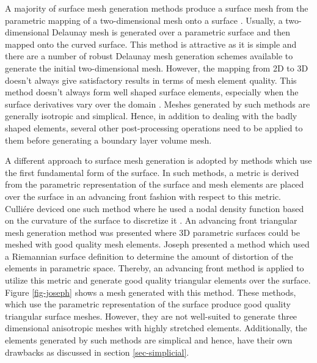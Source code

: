 
A majority of surface mesh generation methods produce a surface mesh from the parametric mapping of a two-dimensional mesh onto a surface \cite{george1998delaunay, chen1997delaunay}. Usually, a two-dimensional Delaunay mesh is generated over a parametric surface and then mapped onto the curved surface. This method is attractive as it is simple and there are a number of robust Delaunay mesh generation schemes available to generate the initial two-dimensional mesh. However, the mapping from 2D to 3D doesn't always give satisfactory results in terms of mesh element quality. This method doesn't always form well shaped surface elements, especially when the surface derivatives vary over the domain \cite{owen1998survey}. Meshes generated by such methods are generally isotropic and simplical. Hence, in addition to dealing with the badly shaped elements, several other post-processing operations need to be applied to them before generating a boundary layer volume mesh.


A different approach to surface mesh generation is adopted by methods which use the first fundamental form of the surface. In such methods, a metric is derived from the parametric representation of the surface and mesh elements are placed over the surface in an advancing front fashion with respect to this metric. Culli\'ere deviced one such method where he used a nodal density function based on the curvature of the surface to discretize it \cite{cuilliere1998adaptive}. An advancing front triangular mesh generation method was presented where 3D parametric surfaces could be meshed with good quality mesh elements. Joseph \etal presented a method which used a Riemannian surface definition to determine the amount of distortion of the elements in parametric space. Thereby, an advancing front method is applied to utilize this metric and generate good quality triangular elements over the surface. Figure \ref{fig-joseph} shows a mesh generated with this method. These methods, which use the parametric representation of the surface produce good quality triangular surface meshes. However, they are not well-suited to generate three dimensional anisotropic meshes with highly stretched elements. Additionally, the elements generated by such methods are simplical and hence, have their own drawbacks as discussed in section \ref{sec-simplicial}.

